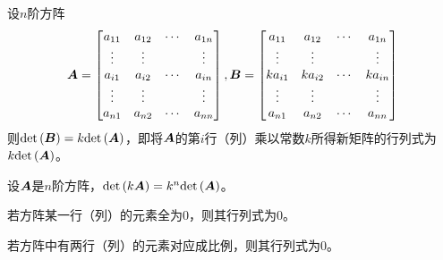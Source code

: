 \documentclass{ctexart}
\begin{document}
\begin{property}
    设\(n\)阶方阵
    \begin{equation*}
        \boldsymbol{A}=\begin{bmatrix}
            a_{11} & a_{12} & \cdots & a_{1n} \\
            \vdots & \vdots &        & \vdots \\
            a_{i1} & a_{i2} & \cdots & a_{in} \\
            \vdots & \vdots &        & \vdots \\
            a_{n1} & a_{n2} & \cdots & a_{nn}
        \end{bmatrix},
        \boldsymbol{B}=
        \begin{bmatrix}
            a_{11}  & a_{12}  & \cdots & a_{1n}  \\
            \vdots  & \vdots  &        & \vdots  \\
            ka_{i1} & ka_{i2} & \cdots & ka_{in} \\
            \vdots  & \vdots  &        & \vdots  \\
            a_{n1}  & a_{n2}  & \cdots & a_{nn}
        \end{bmatrix}
    \end{equation*}
    则\(\mathrm{det}\left( \boldsymbol{B} \right)=k\mathrm{det}\left( \boldsymbol{A} \right)\)，即将\(\boldsymbol{A}\)的第\(i\)行（列）乘以常数\(k\)所得新矩阵的行列式为\(k\mathrm{det}\left( \boldsymbol{A} \right)\)。
\end{property}

\begin{infer}
    设\(\boldsymbol{A}\)是\(n\)阶方阵，\(\mathrm{det}\left( k\boldsymbol{A} \right)=k^n\mathrm{det}\left( \boldsymbol{A} \right)\)。
\end{infer}

\begin{infer}
    若方阵某一行（列）的元素全为\(0\)，则其行列式为\(0\)。
\end{infer}

\begin{infer}
    若方阵中有两行（列）的元素对应成比例，则其行列式为\(0\)。
\end{infer}
\end{document}
